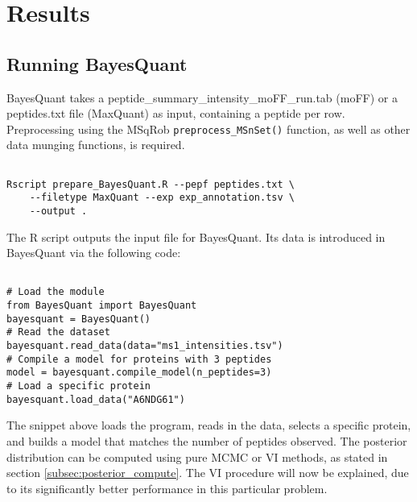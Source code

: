 \section{Results}


\subsection{Running BayesQuant}

BayesQuant takes a peptide\_summary\_intensity\_moFF\_run.tab (moFF) or a peptides.txt file (MaxQuant) as input, containing a peptide per row. Preprocessing using the MSqRob \texttt{preprocess\_MSnSet()} function, as well as other data munging functions, is required.


\begin{verbatim}

Rscript prepare_BayesQuant.R --pepf peptides.txt \
    --filetype MaxQuant --exp exp_annotation.tsv \
    --output .
\end{verbatim}

The R script outputs the input file for BayesQuant. Its data is introduced in BayesQuant via the following code:

\begin{verbatim}

# Load the module
from BayesQuant import BayesQuant
bayesquant = BayesQuant()
# Read the dataset
bayesquant.read_data(data="ms1_intensities.tsv")
# Compile a model for proteins with 3 peptides
model = bayesquant.compile_model(n_peptides=3)
# Load a specific protein
bayesquant.load_data("A6NDG61")
\end{verbatim}

The snippet above loads the program, reads in the data, selects a specific protein, and builds a model that matches the number of peptides observed. The posterior distribution can be computed using pure MCMC or VI methods, as stated in section \ref{subsec:posterior_compute}. The VI procedure will now be explained, due to its significantly better performance in this particular problem.

